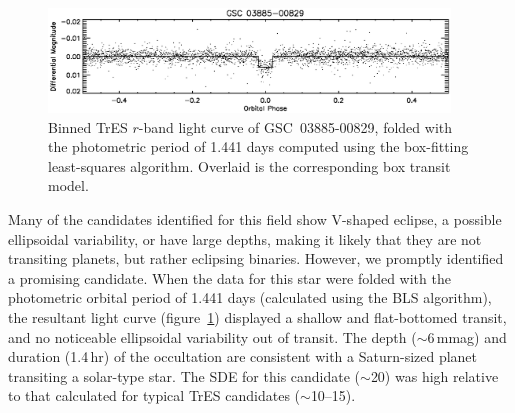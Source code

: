 \begin{figure}
\begin{center}
\includegraphics[width=0.95\textwidth]{3_f1}
\caption[TrES light curve of \mbox{GSC 03885-00829}, a blended eclipsing binary]{Binned TrES $r$-band light curve of \mbox{GSC 03885-00829},
  folded with the photometric period of 1.441 days computed using the
  box-fitting least-squares algorithm. Overlaid is the corresponding
  box transit model.}
\label{cha:gsc:fig:discovery}
\end{center}
\end{figure}

Many of the candidates identified for this field show V-shaped
eclipse, a possible ellipsoidal variability, or have large depths,
making it likely that they are not transiting planets, but rather
eclipsing binaries.  However, we promptly identified a promising
candidate. When the data for this star were folded with the
photometric orbital period of 1.441 days (calculated using the BLS
algorithm), the resultant light curve (figure~\ref{cha:gsc:fig:discovery})
displayed a shallow and flat-bottomed transit, and no noticeable
ellipsoidal variability out of transit. The depth ($\sim$6\,mmag) and
duration (1.4\,hr) of the occultation are consistent with a
Saturn-sized planet transiting a solar-type star.  The SDE for this
candidate ($\sim$20) was high relative to that calculated for typical
TrES candidates ($\sim$10--15).

